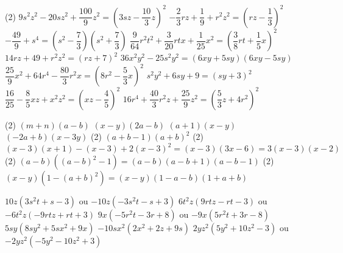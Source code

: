 \documentclass[a4paper,12pt]{report}
\begin{document}
\vspace*{-2\baselineskip}

\begin{core}\phantom{ }

\begin{tasks}(2)
\task $9 s^2 z^2-20 s z^2 + {{\dfrac{100}{9} z^2}}={{\left(3 s z-\dfrac{10}{3} z\right)^2}}$
\task $-\dfrac{2}{3} r z + \dfrac{1}{9}  + {{r^2 z^2}}={{\left(r z-\dfrac{1}{3} \right)^2}}$
\task $-\dfrac{49}{9}  + {{s^4}}={{\left(s^2- \dfrac{7}{3} \right)\left(s^2+\dfrac{7}{3} \right)}}$
\task $\dfrac{9}{64} r^2 t^2 + \dfrac{3}{20} r t x + {{\dfrac{1}{25} x^2}}={{\left(\dfrac{3}{8} r t+\dfrac{1}{5} x\right)^2}}$
\task $14 r z + 49  + {{r^2 z^2}}={{\left(r z+7 \right)^2}}$
\task $36 x^2 y^2- {{25 s^2 y^2}}={{\left(6 x y+ 5 s y\right)\left(6 x y-5 s y\right)}}$
\task $\dfrac{25}{9} x^2 + 64 r^4- {{\dfrac{80}{3} r^2 x}}={{\left(8 r^2-\dfrac{5}{3} x\right)^2}}$
\task $s^2 y^2 + 6 s y + {{9 }}={{\left(s y+3 \right)^2}}$
\task $\dfrac{16}{25} -\dfrac{8}{5} x z + {{x^2 z^2}}={{\left(x z-\dfrac{4}{5} \right)^2}}$
\task $16 r^4 + \dfrac{40}{3} r^2 z + {{\dfrac{25}{9} z^2}}={{\left(\dfrac{5}{3} z+4 r^2\right)^2}}$
\end{tasks}

\end{core}

\begin{core}
	\phantom{}
	\begin{tasks}(2)
		\task $(m+n)(a-b)$
		\task $(x-y)(2a-b)$
		\task $(a+1)(x-y)$
		\task $(-2a+b)(x-3y)$
		\task*(2) $(a+b-1)(a+b)^2$
		\task*(2) $(x-3)(x+1)-(x-3)+2(x-3)^2=(x-3)(3x-6)=3(x-3)(x-2)$
		\task*(2) $(a-b)((a-b)^2-1)=(a-b)(a-b+1)(a-b-1)$
		\task*(2) $(x-y)(1-(a+b)^2)=(x-y)(1-a-b)(1+a+b)$
	\end{tasks}
\end{core}


\begin{core}\phantom{ }

\begin{tasks}
\task ${{10 z(3 s^2 t + s-3 )}}$ ou ${{-10 z(-3 s^2 t-s + 3 )}}$
\task ${{6 t^2 z(9 r t z-r t-3 )}}$ ou ${{-6 t^2 z(-9 r t z + r t + 3 )}}$
\task ${{9 x(-5 r^2 t-3 r + 8 )}}$ ou ${{-9 x(5 r^2 t + 3 r-8 )}}$
\task ${{5 s y(8 s y^2 + 5 s x^2 + 9 x)}}$
\task ${{-10 s x^2(2 x^2 + 2 z + 9 s)}}$
\task ${{2 y z^2(5 y^2 + 10 z^2-3 )}}$ ou ${{-2 y z^2(-5 y^2-10 z^2 + 3 )}}$
\end{tasks}

\end{core}
\end{document}
